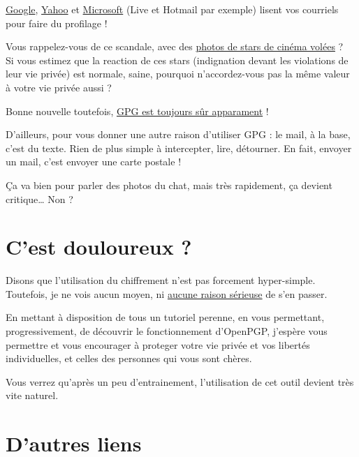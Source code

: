 \href{http://www.linformaticien.com/actualites/id/32860/google-lit-vos-mails-et-assume.aspx}{Google},
\href{http://www.zdnet.fr/actualites/yahoo-lit-les-emails-de-ses-utilisateurs-quoi-de-neuf-doc-39791003.htm}{Yahoo}
et \href{https://tosdr.org/\#microsoft}{Microsoft} (Live et Hotmail par exemple) lisent vos courriels pour faire du profilage !

Vous rappelez-vous de ce scandale, avec des
\href{http://www.huffingtonpost.fr/2014/09/02/jennifer-lawrence-nue-piratage-internet-kate-upton-photos-celebgate_n_5745970.html}{photos
de stars de cinéma volées} ?\\Si vous estimez que la reaction de ces
stars (indignation devant les violations de leur vie privée) est
normale, saine, pourquoi n'accordez-vous pas la même valeur à votre vie
privée aussi ?

Bonne nouvelle toutefois,
\href{http://www.ginjfo.com/actualites/politique-et-economie/espionnage-nsa-depose-les-armes-devant-certaines-solutions-cryptage-20141230}{GPG
est toujours sûr apparament} !

D'ailleurs, pour vous donner une autre raison d'utiliser GPG : le mail,
à la base, c'est du texte. Rien de plus simple à intercepter, lire,
détourner. En fait, envoyer un mail, c'est envoyer une carte postale !

Ça va bien pour parler des photos du chat, mais très rapidement, ça
devient critique\ldots{} Non ?

\section{C'est douloureux ?}\label{cest-douloureux}

Disons que l'utilisation du chiffrement n'est pas forcement
hyper-simple. Toutefois, je ne vois aucun moyen, ni
\href{http://www.itespresso.fr/nsa-se-mobilise-casser-chiffrement-donnees-85704.html}{aucune
raison sérieuse} de s'en passer.

En mettant à disposition de tous un tutoriel perenne, en vous
permettant, progressivement, de découvrir le fonctionnement d'OpenPGP,
j'espère vous permettre et vous encourager à proteger votre vie privée
et vos libertés individuelles, et celles des personnes qui vous sont
chères.

Vous verrez qu'après un peu d'entrainement, l'utilisation de cet outil
devient très vite naturel.

\section{D'autres liens}\label{dautres-liens}

